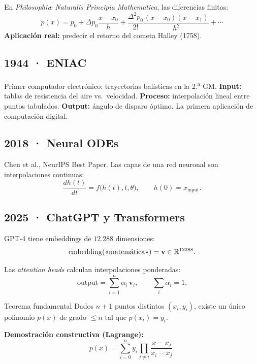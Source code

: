 \documentclass{claudeeditorial}
\begin{document}
En \emph{Philosophiæ Naturalis Principia Mathematica}, las diferencias finitas:
\[
  p(x) = p_0 + \Delta p_0 \frac{x-x_0}{h} + \frac{\Delta^2 p_0}{2!}\frac{(x-x_0)(x-x_1)}{h^2} + \cdots
\]
\textbf{Aplicación real:} predecir el retorno del cometa Halley (1758).

\subsection{1944 · ENIAC}

Primer computador electrónico: trayectorias balísticas en la 2.\textsuperscript{a} GM. \textbf{Input:} tablas de resistencia del aire vs.\ velocidad. \textbf{Proceso:} interpolación lineal entre puntos tabulados. \textbf{Output:} ángulo de disparo óptimo. La primera aplicación de computación digital.

\subsection{2018 · Neural ODEs}

Chen et al., NeurIPS Best Paper. Las capas de una red neuronal son interpolaciones continuas:
\[
  \frac{dh(t)}{dt} = f\bigl(h(t),t,\theta\bigr), \qquad h(0) = x_{\text{input}}.
\]

\subsection{2025 · ChatGPT y Transformers}

GPT-4 tiene embeddings de $12.288$ dimensiones:
\[
  \operatorname{embedding}(\text{«matemática»}) = \mathbf{v}\in\mathbb{R}^{12288}.
\]

Las \emph{attention heads} calculan interpolaciones ponderadas:
\[
  \text{output} = \sum_{i=1}^{n}\alpha_i\,\mathbf{v}_i, \qquad \sum_i \alpha_i = 1.
\]



\begin{ClaudeCard}{Teorema fundamental}
Dados $n+1$ puntos distintos $(x_i,y_i)$, existe un único polinomio $p(x)$ de grado $\leq n$ tal que $p(x_i)=y_i$.

\textbf{Demostración constructiva (Lagrange):}
\[
  p(x) = \sum_{i=0}^{n} y_i \prod_{j\neq i} \frac{x-x_j}{x_i-x_j}.
\]
\end{ClaudeCard}
\end{document}
